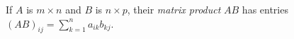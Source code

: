 
If $A$ is $m\times n$ and $B$ is $n\times p$, their \emph{matrix product} $AB$ has entries $(AB)_{ij}=\sum_{k=1}^n a_{ik}b_{kj}$.
